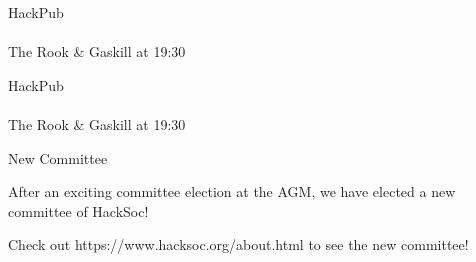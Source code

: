 \documentclass[14pt, landscape]{article}
\begin{document}
\begin{minipage}[t][17cm][t]{\textwidth}
\begin{multicols}{2}
\begin{minipage}{0.5\textwidth}
\begin{addmargin}[1em]{0em}
{\fontsize{24}{34}\selectfont \textcolor{emphasistext}{HackPub}}\\
\vspace{0.05cm}\\
{\fontsize{20}{30}\selectfont The Rook \& Gaskill at 19:30}

\vspace{0.5cm}

{\fontsize{24}{34}\selectfont \textcolor{emphasistext}{HackPub}}\\
\vspace{0.05cm}\\
{\fontsize{20}{30}\selectfont The Rook \& Gaskill at 19:30}
\end{addmargin}
\end{minipage}
\vspace{0.75cm}

\begin{minipage}{0.45\textwidth}
{\fontsize{30}{40}\selectfont New Committee}\\
\begin{addmargin}[1em]{0em}
{\fontsize{16}{20}\selectfont After an exciting committee election at the AGM, we have elected a new committee of HackSoc!\par}
{\fontsize{16}{20}\selectfont Check out https://www.hacksoc.org/about.html to see the new committee!\par}
\end{addmargin}
\end{minipage}

\end{multicols}
\end{minipage}

\noindent\hdashrule[0cm]{39.5cm}{1pt}{2pt}
\end{document}
